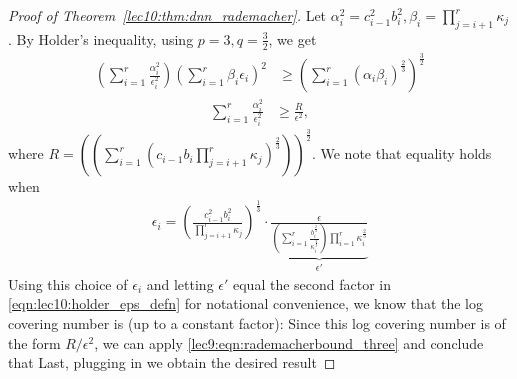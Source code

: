 \begin{proof}[Proof of Theorem~\ref{lec10:thm:dnn_rademacher}]
Let $\alpha_i^2 = c_{i-1}^2b_i^2, \beta_i = \prod_{j=i+1}^{r}\kappa_j$. By Holder's inequality, using $p = 3, q = \frac{3}{2}$, we get
\begin{align}
    \left(\sum_{i=1}^{r}\frac{\alpha_i^2}{\epsilon_i^2}\right)\left(\sum_{i=1}^{r}\beta_i\epsilon_i\right)^2 &\geq \left(\sum_{i=1}^{r}\left(\alpha_i\beta_i\right)^{\frac{2}{3}}\right)^{\frac{3}{2}}
\end{align}
\begin{align}
    \sum_{i=1}^{r}\frac{\alpha_i^2}{\epsilon_i^2} &\geq \frac{R}{\epsilon^2},
\end{align}
where $R = \left(\left(\sum_{i=1}^{r}\left(c_{i-1}b_i\prod_{j=i+1}^{r}\kappa_j\right)^{\frac{2}{3}}\right)\right)^{\frac{3}{2}}$. We note that equality holds when 
\begin{align}
    \epsilon_i = \left(\frac{c_{i-1}^2b_i^2}{\prod_{j=i+1}^{r}\kappa_j}\right)^{\frac{1}{3}} \cdot \underbrace{\frac{\epsilon}{\left(\sum_{i=1}^{r}\frac{b_i^{\frac{2}{3}}}{\kappa_i^{\frac{2}{3}}}\right)\prod_{i=1}^{r}\kappa_i^{\frac{2}{3}} }}_{\epsilon'} \label{eqn:lec10:holder_eps_defn}
\end{align}
Using this choice of $\epsilon_i$ and letting $\epsilon'$ equal the second factor in \eqref{eqn:lec10:holder_eps_defn} for notational convenience, we know that the log covering number is (up to a constant factor):
Since this log covering number is of the form $R / \epsilon^2$, we can apply \eqref{lec9:eqn:rademacherbound_three} and conclude that
Last, plugging in
we obtain the desired result

\end{proof}

